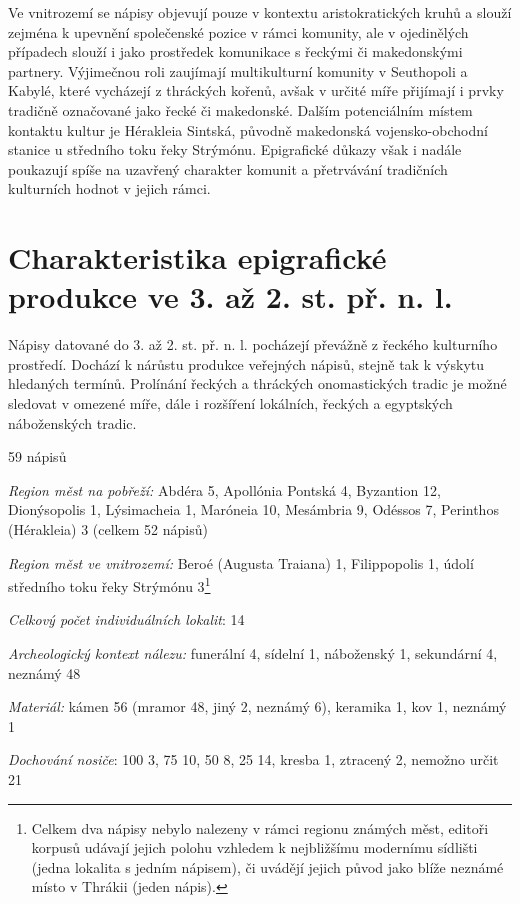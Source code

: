 Ve vnitrozemí se nápisy objevují pouze v kontextu aristokratických kruhů a slouží zejména k upevnění společenské pozice v rámci komunity, ale v ojedinělých případech slouží i jako prostředek komunikace s řeckými či makedonskými partnery. Výjimečnou roli zaujímají multikulturní komunity v Seuthopoli a Kabylé, které vycházejí z thráckých kořenů, avšak v určité míře přijímají i prvky tradičně označované jako řecké či makedonské. Dalším potenciálním místem kontaktu kultur je Hérakleia Sintská, původně makedonská vojensko-obchodní stanice u středního toku řeky Strýmónu. Epigrafické důkazy však i nadále poukazují spíše na uzavřený charakter komunit a přetrvávání tradičních kulturních hodnot v jejich rámci.

\section[charakteristika-epigrafické-produkce-ve-3.-až-2.-st.-př.-n.-l.]{Charakteristika epigrafické produkce ve 3. až 2. st. př. n. l.}

Nápisy datované do 3. až 2. st. př. n. l. pocházejí převážně z řeckého kulturního prostředí. Dochází k nárůstu produkce veřejných nápisů, stejně tak k výskytu hledaných termínů. Prolínání řeckých a thráckých onomastických tradic je možné sledovat v omezené míře, dále i rozšíření lokálních, řeckých a egyptských náboženských tradic.

\placetable[none]{}
\starttable[|l|]
\HL
{} 59 nápisů

{\em Region měst na pobřeží:} Abdéra 5, Apollónia Pontská 4, Byzantion 12, Dionýsopolis 1, Lýsimacheia 1, Maróneia 10, Mesámbria 9, Odéssos 7, Perinthos (Hérakleia) 3 (celkem 52 nápisů)

{\em Region měst ve vnitrozemí:} Beroé (Augusta Traiana) 1, Filippopolis 1, údolí středního toku řeky Strýmónu 3\footnote{Celkem dva nápisy nebylo nalezeny v rámci regionu známých měst, editoři korpusů udávají jejich polohu vzhledem k nejbližšímu modernímu sídlišti (jedna lokalita s jedním nápisem), či uvádějí jejich původ jako blíže neznámé místo v Thrákii (jeden nápis).}

{\em Celkový počet individuálních lokalit}: 14

{\em Archeologický kontext nálezu:} funerální 4, sídelní 1, náboženský 1, sekundární 4, neznámý 48

{\em Materiál:} kámen 56 (mramor 48, jiný 2, neznámý 6), keramika 1, kov 1, neznámý 1

{\em Dochování nosiče}: 100  3, 75  10, 50  8, 25  14, kresba 1, ztracený 2, nemožno určit 21

